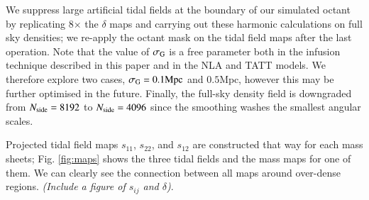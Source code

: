 We suppress large artificial tidal fields at the boundary of our simulated octant by replicating 8$\times$ the  $\delta$ maps and carrying out these harmonic calculations  on full sky densities; we re-apply the octant mask on the tidal field maps after the last operation.
Note that the value of $\sigma_{\rm G}$ is a free parameter both in the infusion technique described in this paper and in the NLA and TATT models.
We therefore explore two cases, $\sigma_{\rm G}=0.1\mathrm{Mpc}$ and $0.5\mathrm{Mpc}$, however this may be further optimised in the future.
Finally, the full-sky density field is downgraded from $N_{\rm side}=8192$ to $N_{\rm side}=4096$ since the smoothing washes the smallest angular scales. 



Projected tidal field maps $s_{11}$, $s_{22}$, and $s_{12}$ are constructed that way for each mass sheets; Fig. \ref{fig:maps} shows the  three tidal fields and the mass maps for one of them.
We can clearly see the connection between all maps around over-dense regions. {\it (Include a figure of $s_{ij}$ and $\delta$)}. 


